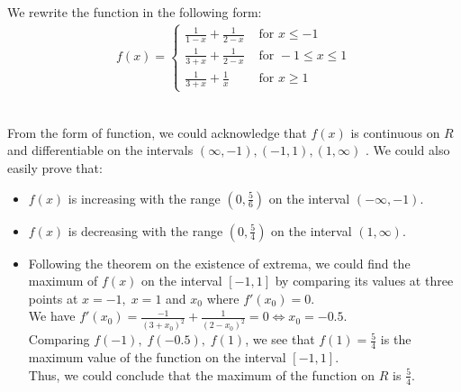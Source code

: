 \begin{numedquestion}
  \begin{minipage}{0.45\textwidth}
    We rewrite the function in the following form:
    \begin{align*}
      f(x) = \begin{cases} \tfrac{1}{1-x} + \tfrac{1}{2-x} &\text{ for } x \leq -1\\ \tfrac{1}{3+x} + \tfrac{1}{2-x} &\text{ for } -1 \leq x \leq 1 \\ \tfrac{1}{3+x} + \tfrac{1}{x}  &\text{ for } x \geq 1 \end{cases}
    \end{align*}
  \end{minipage}
  \begin{minipage}{0.45\textwidth}
\end{minipage}\\
From the form of function, we could acknowledge that $f(x)$ is continuous on $R$ and differentiable on the intervals $(\infty, -1), (-1,1), (1,\infty)$ . We could also easily prove that: 
\begin{itemize}
  \item $f(x)$ is increasing with the range $(0, \frac{5}{6})$ on the interval $(-\infty, -1)$.
  \item $f(x)$ is decreasing with the range $(0, \frac{5}{4})$ on the interval $(1, \infty)$.
  \item Following the theorem on the
  existence of extrema, we could find the maximum of $f(x)$ on the interval $[-1,1]$ by comparing its values at three points at $x = -1,\; x = 1$ and $x_0$ where $f'(x_0) = 0$.\\

  We have $f'(x_0) = \frac{-1}{(3+x_0)^2} + \frac{1}{(2-x_0)^2} = 0 \iff x_0 = -0.5$. \\

  Comparing $f(-1),\; f(-0.5),\; f(1)$, we see that $f(1) = \frac{5}{4}$ is the maximum value of the function on the interval $[-1,1]$.\\
  Thus, we could conclude that the maximum of the function on $R$ is $\frac{5}{4}$.
\end{itemize}
\end{numedquestion}

